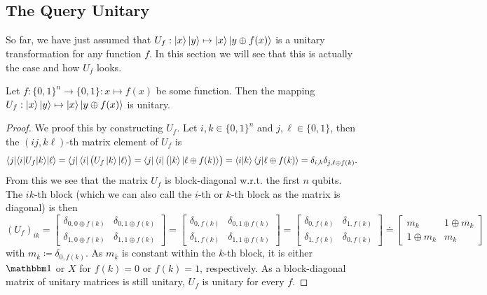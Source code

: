 		\subsection{The Query Unitary}
			\label{subsec:queryUnitary}

			So far, we have just assumed that \( U_f : \ket{x}\ket{y} \mapsto \ket{x}\ket{y \oplus f(x)} \) is a unitary transformation for any function \(f\). In this section we will see that this is actually the case and how \(U_f\) looks.

			\begin{theorem}
				Let \( f : \{ 0, 1 \}^n \to \{ 0, 1 \} : x \mapsto f(x) \) be some function. Then the mapping \( U_f : \ket{x}\ket{y} \mapsto \ket{x}\ket{y \oplus f(x)} \) is unitary.
			\end{theorem}
			\begin{proof}
				We proof this by constructing \(U_f\). Let \( i, k \in \{ 0, 1 \}^n \) and \( j, \ell \in \{ 0, 1 \} \), then the \( (ij, k\ell) \)-th matrix element of \(U_f\) is
				\begin{equation}
					\bra{j}\!\!\mel{i}{U_f}{k}\!\ket{\ell}
						= \bra{j} \bra{i} \bigl( U_f \ket{k} \ket{\ell} \bigr)
						= \bra{j} \bra{i} \bigl( \ket{k} \ket{\ell \oplus f(k)} \bigr)
						= \braket{i}{k} \braket{j}{\ell \oplus f(k)}
						= \delta_{i, k} \delta_{j, \ell \oplus f(k)}.
				\end{equation}
				From this we see that the matrix \(U_f\) is block-diagonal w.r.t. the first \(n\) qubits. The \(ik\)-th block (which we can also call the \(i\)-th or \(k\)-th block as the matrix is diagonal) is then
				\begin{equation}
					(U_f)_{ik}
					=
					\begin{bmatrix}
						\delta_{0, 0 \oplus f(k)} & \delta_{0, 1 \oplus f(k)} \\
						\delta_{1, 0 \oplus f(k)} & \delta_{1, 1 \oplus f(k)}
					\end{bmatrix}
					=
					\begin{bmatrix}
						\delta_{0, f(k)} & \delta_{0, 1 \oplus f(k)} \\
						\delta_{1, f(k)} & \delta_{1, 1 \oplus f(k)}
					\end{bmatrix}
					=
					\begin{bmatrix}
						\delta_{0, f(k)} & \delta_{1, f(k)} \\
						\delta_{1, f(k)} & \delta_{0, f(k)}
					\end{bmatrix}
					\doteq
					\begin{bmatrix}
						m_k & 1 \oplus m_k \\
						1 \oplus m_k & m_k
					\end{bmatrix}
				\end{equation}
				with \( m_k \coloneqq \delta_{0, f(k)} \). As \(m_k\) is constant within the \(k\)-th block, it is either \(\ID\) or \(X\) for \(f(k) = 0\) or \(f(k) = 1\), respectively. As a block-diagonal matrix of unitary matrices is still unitary, \(U_f\) is unitary for every \(f\).
			\end{proof}

